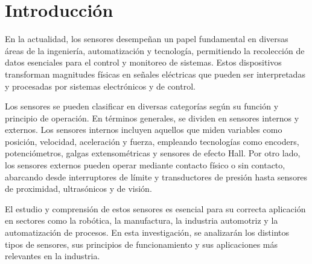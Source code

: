 \section{Introducción}
En la actualidad, los sensores desempeñan un papel fundamental en diversas áreas de la ingeniería, automatización y tecnología, permitiendo la recolección de datos esenciales para el control y monitoreo de sistemas. Estos dispositivos transforman magnitudes físicas en señales eléctricas que pueden ser interpretadas y procesadas por sistemas electrónicos y de control.

Los sensores se pueden clasificar en diversas categorías según su función y principio de operación. En términos generales, se dividen en sensores internos y externos. Los sensores internos incluyen aquellos que miden variables como posición, velocidad, aceleración y fuerza, empleando tecnologías como encoders, potenciómetros, galgas extensométricas y sensores de efecto Hall. Por otro lado, los sensores externos pueden operar mediante contacto físico o sin contacto, abarcando desde interruptores de límite y transductores de presión hasta sensores de proximidad, ultrasónicos y de visión.

El estudio y comprensión de estos sensores es esencial para su correcta aplicación en sectores como la robótica, la manufactura, la industria automotriz y la automatización de procesos. En esta investigación, se analizarán los distintos tipos de sensores, sus principios de funcionamiento y sus aplicaciones más relevantes en la industria.
